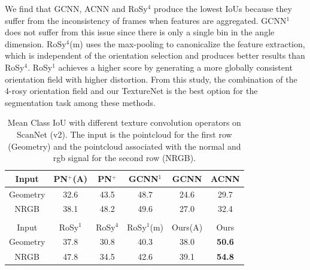 We find that GCNN, ACNN and RoSy$^4$ produce the lowest IoUs because they suffer from the inconsistency of frames when features are aggregated.  GCNN$^1$ does not suffer from this issue since there is only a single bin in the angle dimension. RoSy$^4$(m) uses the max-pooling to canonicalize the feature extraction, which is independent of the orientation selection and produces better results than RoSy$^4$. RoSy$^1$ achieves a higher score by generating a more globally consistent orientation field with higher distortion. From this study, the combination of the 4-rosy orientation field and our TextureNet is the best option for the segmentation task among these methods.  %

\begin{table}
    \centering
    \tabcolsep=0.03cm
    \begin{tabular}{|c|c|c|c|c|c|}
        \hline
         Input & PN$^+$(A) & PN$^+$ & GCNN$^1$ & GCNN & ACNN\\
         \hline
         Geometry & 32.6 & 43.5 & 48.7 & 24.6 & 29.7\\
         \hline
         NRGB & 38.1 & 48.2 & 49.6 & 27.0 & 32.4\\
         \hline
         \multicolumn{6}{c}{}\\
         \hline
         Input &  RoSy$^1$ & RoSy$^4$ & RoSy$^1$(m) & Ours(A) & Ours\\
         \hline
         Geometry & 37.8 & 30.8 & 40.3 & 38.0 & \textbf{50.6}\\
         \hline
         NRGB & 47.8 & 34.5 & 42.6 & 39.1 & \textbf{54.8}\\
         \hline
    \end{tabular}
    \caption{Mean Class IoU with different texture convolution operators on ScanNet (v2). The input is the pointcloud for the first row (Geometry) and the pointcloud associated with the normal and rgb signal for the second row (NRGB).}
    \label{tab:texturenet-operator}
\end{table}


